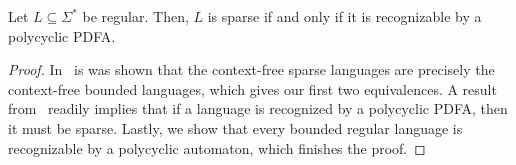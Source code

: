 \begin{propositionrep}
\label{thm:bounded_characterization}
 Let $L \subseteq \Sigma^*$ be regular. Then, $L$ is sparse
 if and only if it is recognizable by a polycyclic PDFA.
\end{propositionrep}
\begin{proof}
 In~\cite{DBLP:journals/eik/LatteuxT84} is was shown that the context-free sparse languages are precisely the context-free bounded languages, which
 gives our first two equivalences.
 A result from~\cite[Lemma 2]{DBLP:journals/ijfcs/GawrychowskiKRS10}
 readily implies that if a language is recognized by a polycyclic PDFA, then
 it must be sparse.
 Lastly, we show that every bounded regular language
 is recognizable by a polycyclic automaton, which finishes the proof.
 
 \medskip 
 

\end{proof}
